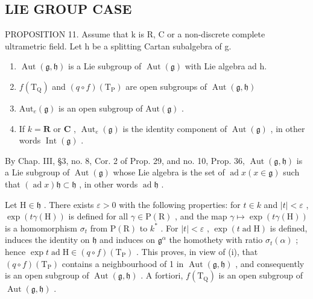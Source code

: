 \subsection{LIE GROUP CASE}

PROPOSITION 11. Assume that k is R, C or a non-discrete complete ultrametric field. Let h be a splitting Cartan subalgebra of g.

\begin{enumerate}
\def\labelenumi{(\roman{enumi})}
\item
  \(\operatorname{Aut}(\mathfrak{g},\mathfrak{h})\) is a Lie subgroup of \(\operatorname{Aut}(\mathfrak{g})\) with Lie algebra ad h.
\item
  \(f(\mathrm{T}_{\mathrm{Q}})\) and \((q\circ f)(\mathrm{T}_{\mathrm{P}})\) are open subgroups of \(\operatorname {Aut}(\mathfrak{g},\mathfrak{h})\)
\item
  \(\mathrm{Aut}_e(\mathfrak{g})\) is an open subgroup of \(\mathrm{Aut}(\mathfrak{g})\) .
\item
  If \(k = \mathbf{R}\) or \(\mathbf{C}\) , \(\operatorname{Aut}_e(\mathfrak{g})\) is the identity component of \(\operatorname{Aut}(\mathfrak{g})\) , in other words \(\operatorname{Int}(\mathfrak{g})\) .
\end{enumerate}

By Chap. III, §3, no. 8, Cor. 2 of Prop. 29, and no. 10, Prop. 36, \(\operatorname{Aut}(\mathfrak{g}, \mathfrak{h})\) is a Lie subgroup of \(\operatorname{Aut}(\mathfrak{g})\) whose Lie algebra is the set of \(\operatorname{ad} x (x \in \mathfrak{g})\) such that \((\operatorname{ad} x) \mathfrak{h} \subset \mathfrak{h}\) , in other words \(\operatorname{ad} \mathfrak{h}\) .

Let \(\mathrm{H} \in \mathfrak{h}\) . There exists \(\varepsilon > 0\) with the following properties: for \(t \in k\) and \(|t| < \varepsilon\) , \(\exp(t\gamma(\mathrm{H}))\) is defined for all \(\gamma \in \mathrm{P}(\mathrm{R})\) , and the map \(\gamma \mapsto \exp(t\gamma(\mathrm{H}))\) is a homomorphism \(\sigma_t\) from \(\mathrm{P}(\mathrm{R})\) to \(k^*\) . For \(|t| < \varepsilon\) , \(\exp(t\operatorname{ad}\mathrm{H})\) is defined, induces the identity on \(\mathfrak{h}\) and induces on \(\mathfrak{g}^\alpha\) the homothety with ratio \(\sigma_t(\alpha)\) ; hence \(\exp t\operatorname{ad}\mathrm{H} \in (q \circ f)(\mathrm{T}_{\mathrm{P}})\) . This proves, in view of (i), that \((q \circ f)(\mathrm{T}_{\mathrm{P}})\) contains a neighbourhood of 1 in \(\operatorname{Aut}(\mathfrak{g},\mathfrak{h})\) , and consequently is an open subgroup of \(\operatorname{Aut}(\mathfrak{g},\mathfrak{h})\) . A fortiori, \(f(\mathrm{T}_{\mathrm{Q}})\) is an open subgroup of \(\operatorname{Aut}(\mathfrak{g},\mathfrak{h})\) .

